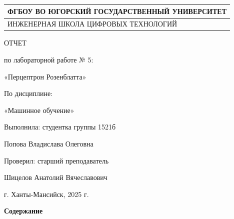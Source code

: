 \documentclass{article}%
\begin{document}
%
\normalsize%
\begin{longtable}{|>{\centering\arraybackslash}p{17.176750000000002cm}|}%
\hline%
ФГБОУ ВО ЮГОРСКИЙ ГОСУДАРСТВЕННЫЙ УНИВЕРСИТЕТ%
 \\ \hline \endfirsthead%
\hline%
ИНЖЕНЕРНАЯ ШКОЛА ЦИФРОВЫХ ТЕХНОЛОГИЙ%
 \\ \hline%
\end{longtable}%
\begin{center}%
ОТЧЕТ%
%
\end{center}%
\begin{center}%
по лабораторной работе № 5:%
%
\end{center}%
\begin{center}%
«Перцептрон Розенблатта»%
%
\end{center}%
\begin{center}%
По дисциплине:%
%
\end{center}%
\begin{center}%
«Машинное обучение»%
%
\end{center}%
\begin{flushleft}%
Выполнила: студентка группы 1521б%
%
\end{flushleft}%
\begin{flushleft}%
Попова Владислава Олеговна%
%
\end{flushleft}%
\begin{flushleft}%
Проверил: старший преподаватель%
%
\end{flushleft}%
\begin{flushleft}%
Шицелов Анатолий Вячеславович%
%
\end{flushleft}%
\begin{center}%
г. Ханты-Мансийск, 2025 г.%
%
\end{center}%
\begin{center}%
\textbf{Содержание}%
%
\end{center}%
\begin{flushleft}%
%
\end{flushleft}%
\end{document}
